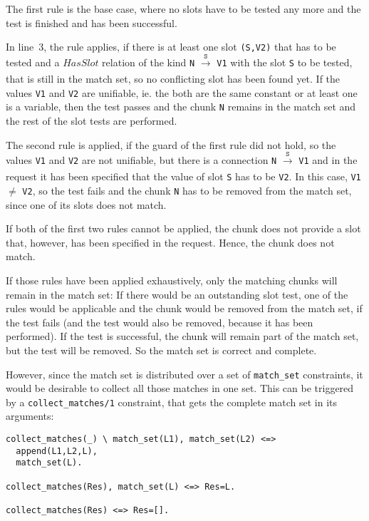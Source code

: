 The first rule is the base case, where no slots have to be tested any more and the test is finished and has been successful.

In line~3, the rule applies, if there is at least one slot \verb|(S,V2)| that has to be tested and a $HasSlot$ relation of the kind \verb|N| $\xrightarrow[]{\mathtt{S}}$ \verb|V1| with the slot \verb|S| to be tested, that is still in the match set, so no conflicting slot has been found yet. If the values \verb|V1| and \verb|V2| are unifiable, ie. the both are the same constant or at least one is a variable, then the test passes and the chunk \verb|N| remains in the match set and the rest of the slot tests are performed.

The second rule is applied, if the guard of the first rule did not hold, so the values \verb|V1| and \verb|V2| are not unifiable, but there is a connection \verb|N| $\xrightarrow[]{\mathtt{S}}$ \verb|V1| and in the request it has been specified that the value of slot \verb|S| has to be \verb|V2|. In this case, \verb|V1| $\neq$ \verb|V2|, so the test fails and the chunk \verb|N| has to be removed from the match set, since one of its slots does not match.

If both of the first two rules cannot be applied, the chunk does not provide a slot that, however, has been specified in the request. Hence, the chunk does not match. 

If those rules have been applied exhaustively, only the matching chunks will remain in the match set: If there would be an outstanding slot test, one of the rules would be applicable and the chunk would be removed from the match set, if the test fails (and the test would also be removed, because it has been performed). If the test is successful, the chunk will remain part of the match set, but the test will be removed. So the match set is correct and complete.

However, since the match set is distributed over a set of \verb|match_set| constraints, it would be desirable to collect all those matches in one set. This can be triggered by a \verb|collect_matches/1| constraint, that gets the complete match set in its arguments:

\begin{lstlisting}
collect_matches(_) \ match_set(L1), match_set(L2) <=> 
  append(L1,L2,L), 
  match_set(L).
  
collect_matches(Res), match_set(L) <=> Res=L.

collect_matches(Res) <=> Res=[].
\end{lstlisting}

